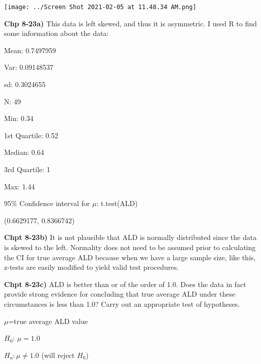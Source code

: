 \documentclass{article}
\begin{document}
\vspace{5mm}

\texttt{[image: ../Screen Shot 2021-02-05 at 11.48.34 AM.png]}

\vspace{3mm}

\newpage

\textbf{Chp 8-23a)} This data is left skewed, and thus it is asymmetric. I used R to find some information about the data:

\vspace{2mm}

Mean: 0.7497959

Var: 0.09148537

sd: 0.3024655

N: 49

Min: 0.34

1st Quartile: 0.52

Median: 0.64

3rd Quartile:  1 

Max: 1.44

95\% Confidence interval for $\mu$: t.test(ALD)
  
(0.6629177,  0.8366742)

\vspace{3mm}


\textbf{Chpt 8-23b)} It is not plausible that ALD is normally distributed since the data is skewed to the left. Normality does not need to be assumed prior to calculating the CI for true average ALD because when we have a large sample size, like this, z-tests are easily modified to yield valid test procedures.

\vspace{3mm}

\textbf{Chpt 8-23c)} ALD is better than or of the order of 1.0. Does the data in fact provide strong evidence for concluding that true average ALD under these circumstances is less than 1.0? Carry out an appropriate test of hypotheses.

\vspace{2mm}

$\mu$=true average ALD value

\vspace{2mm}

$H_{0}$: $\mu=1.0$

\vspace{2mm}

$H_{a}: \mu \ne 1.0$ (will reject $H_{0}$)

\vspace{2mm}
\end{document}
